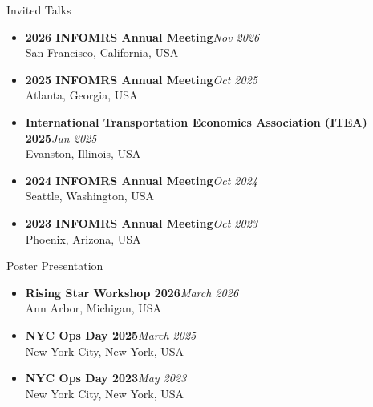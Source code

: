 \documentclass{resume} %
\begin{document}
\begin{rSection}{Invited Talks}
\begin{itemize}
\item {\bf 2026 INFOMRS Annual Meeting}\hfill {\em Nov 2026}\\
San Francisco, California, USA
\item {\bf 2025 INFOMRS Annual Meeting}\hfill {\em Oct 2025}\\
Atlanta, Georgia, USA
\item {\bf International Transportation Economics Association (ITEA) 2025}\hfill {\em Jun 2025}\\
Evanston, Illinois, USA
\item {\bf 2024 INFOMRS Annual Meeting}\hfill {\em Oct 2024}\\
Seattle, Washington, USA
\item {\bf 2023 INFOMRS Annual Meeting}\hfill {\em Oct 2023}\\
Phoenix, Arizona, USA
\end{itemize}
\end{rSection}

\begin{rSection}{Poster Presentation}
\begin{itemize}
\item {\bf Rising Star Workshop 2026}\hfill {\em March 2026}\\
Ann Arbor, Michigan, USA
\item {\bf NYC Ops Day 2025}\hfill {\em March 2025}\\
New York City, New York, USA
\item {\bf NYC Ops Day 2023}\hfill {\em May 2023}\\
New York City, New York, USA
\end{itemize}
\end{rSection}
\end{document}

